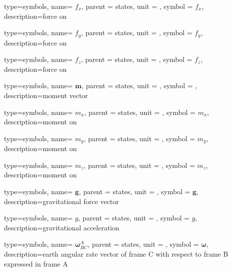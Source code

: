 {type=symbols,
	name= \ensuremath{f_{x}},
	parent = {states},
	unit = \unexpanded{\si{\newton}},
	symbol = \ensuremath{f_{x}},
	description={force on }
}

{type=symbols,
	name= \ensuremath{f_{y}},
	parent = {states},
	unit = \unexpanded{\si{\newton}},
	symbol = \ensuremath{f_{y}},
	description={force on }
}

{type=symbols,
	name= \ensuremath{f_{z}},
	parent = {states},
	unit = \unexpanded{\si{\newton}},
	symbol = \ensuremath{f_{z}},
	description={force on }
}


{type=symbols,
	name= \ensuremath{\mathbf{m}},
	parent = {states},
	unit = \unexpanded{},
	symbol = ,
	description={moment vector}
}

{type=symbols,
	name= \ensuremath{m_{x}},
	parent = {states},
	unit = \unexpanded{\si{\newton\meter}},
	symbol = \ensuremath{m_{x}},
	description={moment on }
}

{type=symbols,
	name= \ensuremath{m_{y}},
	parent = {states},
	unit = \unexpanded{\si{\newton\meter}},
	symbol = \ensuremath{m_{y}},
	description={moment on }
}

{type=symbols,
	name= \ensuremath{m_{z}},
	parent = {states},
	unit = \unexpanded{\si{\newton\meter}},
	symbol = \ensuremath{m_{z}},
	description={moment on }
}

{type=symbols,
	name= \ensuremath{\mathbf{g}},
	parent = {states},
	unit = \unexpanded{},
	symbol = \ensuremath{\mathbf{g}},
	description={gravitational force vector}
}

{type=symbols,
	name= \ensuremath{g},
	parent = {states},
	unit = \unexpanded{\si{\meter\per\second\squared}},
	symbol = \ensuremath{g},
	description={gravitational acceleration}
}

{type=symbols,
	name= \ensuremath{\boldsymbol{\omega}_{BC}^{A}},
	parent = {states},
	unit = \unexpanded{\si{\radian\per\second}},
	symbol = \ensuremath{\boldsymbol{\omega}},
	description={earth angular rate vector of frame C with respect to frame B expressed in frame A}
}

